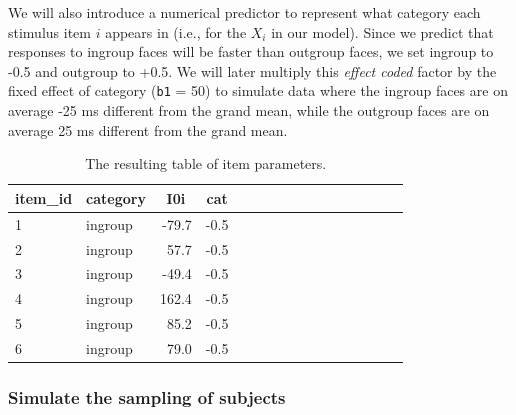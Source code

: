 \documentclass[doc,floatsintext]{apa6}
\newenvironment{Shaded}{\begin{snugshade}}{\end{snugshade}}
\newcommand{\KeywordTok}[1]{\textcolor[rgb]{0.13,0.29,0.53}{\textbf{#1}}}
\newcommand{\FloatTok}[1]{\textcolor[rgb]{0.00,0.00,0.81}{#1}}
\newcommand{\StringTok}[1]{\textcolor[rgb]{0.31,0.60,0.02}{#1}}
\newcommand{\CommentTok}[1]{\textcolor[rgb]{0.56,0.35,0.01}{\textit{#1}}}
\newcommand{\OperatorTok}[1]{\textcolor[rgb]{0.81,0.36,0.00}{\textbf{#1}}}
\newcommand{\NormalTok}[1]{#1}
\begin{document}
We will also introduce a numerical predictor to represent what category
each stimulus item \(i\) appears in (i.e., for the \(X_i\) in our
model). Since we predict that responses to ingroup faces will be faster
than outgroup faces, we set ingroup to -0.5 and outgroup to +0.5. We
will later multiply this \emph{effect coded} factor by the fixed effect
of category (\texttt{b1} = 50) to simulate data where the ingroup faces
are on average -25 ms different from the grand mean, while the outgroup
faces are on average 25 ms different from the grand mean.

\begin{Shaded}
\end{Shaded}

\begin{table}[H]
\begin{center}
\begin{threeparttable}
\caption{\label{tab:items-table}The resulting table of item parameters.}
\begin{tabular}{llrrllrrllrrllrr}
\toprule
item\_id & \multicolumn{1}{c}{category} & \multicolumn{1}{c}{I0i} & \multicolumn{1}{c}{cat}\\
\midrule
1 & ingroup & -79.7 & -0.5\\
2 & ingroup & 57.7 & -0.5\\
3 & ingroup & -49.4 & -0.5\\
4 & ingroup & 162.4 & -0.5\\
5 & ingroup & 85.2 & -0.5\\
6 & ingroup & 79.0 & -0.5\\
\bottomrule
\end{tabular}
\end{threeparttable}
\end{center}
\end{table}

\subsubsection{Simulate the sampling of
subjects}\label{simulate-the-sampling-of-subjects}
\end{document}
